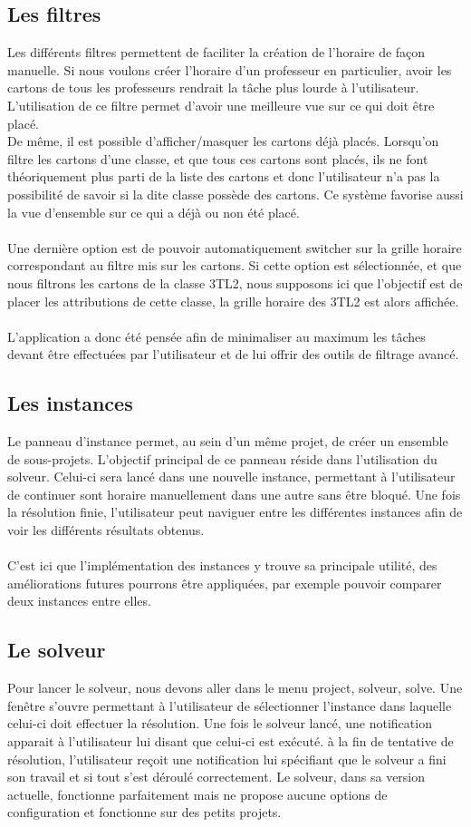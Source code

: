 \subsection{Les filtres}
Les différents filtres permettent de faciliter la création de l'horaire de façon manuelle. Si nous voulons créer l'horaire d'un professeur en particulier, avoir les cartons de tous les professeurs rendrait la tâche plus lourde à l'utilisateur. L'utilisation de ce filtre permet d'avoir une meilleure vue sur ce qui doit être placé.\\
De même, il est possible d'afficher/masquer les cartons déjà placés. Lorsqu'on filtre les cartons d'une classe, et que tous ces cartons sont placés, ils ne font théoriquement plus parti de la liste des cartons et donc l'utilisateur n'a pas la possibilité de savoir si la dite classe possède des cartons. Ce système favorise aussi la vue d'ensemble sur ce qui a déjà ou non été placé.\\
\\
Une dernière option est de pouvoir automatiquement switcher sur la grille horaire correspondant au filtre mis sur les cartons. Si cette option est sélectionnée, et que nous filtrons les cartons de la classe 3TL2, nous supposons ici que l'objectif est de placer les attributions de cette classe, la grille horaire des 3TL2 est alors affichée.\\
\\
L'application a donc été pensée afin de minimaliser au maximum les tâches devant être effectuées par l'utilisateur et de lui offrir des outils de filtrage avancé.
\subsection{Les instances}
Le panneau d'instance permet, au sein d'un même projet, de créer un ensemble de sous-projets. L'objectif principal de ce panneau réside dans l'utilisation du solveur. Celui-ci sera lancé dans une nouvelle instance, permettant à l'utilisateur de continuer sont horaire manuellement dans une autre sans être bloqué. Une fois la résolution finie, l'utilisateur peut naviguer entre les différentes instances afin de voir les différents résultats obtenus. \\
\\
C'est ici que l'implémentation des instances y trouve sa principale utilité, des améliorations futures pourrons être appliquées, par exemple pouvoir comparer deux instances entre elles.
\subsection{Le solveur}
Pour lancer le solveur, nous devons aller dans le menu project, solveur, solve. Une fenêtre s'ouvre permettant à l'utilisateur de sélectionner l'instance dans laquelle celui-ci doit effectuer la résolution. Une fois le solveur lancé, une notification apparait à l'utilisateur lui disant que celui-ci est exécuté. à la fin de tentative de résolution, l'utilisateur reçoit une notification lui spécifiant que le solveur a fini son travail et si tout s'est déroulé correctement. Le solveur, dans sa version actuelle, fonctionne parfaitement mais ne propose aucune options de configuration et fonctionne sur des petits projets. 
